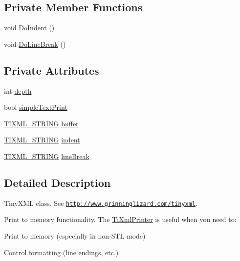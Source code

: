 \subsection*{Private Member Functions}
\begin{DoxyCompactItemize}
\item 
void \hyperlink{class_ti_xml_printer_a348ad6527b1d43ddeb51454cddeb6a1d}{Do\+Indent} ()
\item 
void \hyperlink{class_ti_xml_printer_a252a0e13e06def9a06b2eb30a04677a0}{Do\+Line\+Break} ()
\end{DoxyCompactItemize}
\subsection*{Private Attributes}
\begin{DoxyCompactItemize}
\item 
int \hyperlink{class_ti_xml_printer_a7e11330449daea912320c22f84387df7}{depth}
\item 
bool \hyperlink{class_ti_xml_printer_a2dceede5ae9bb8948f1ecaabb24ab2fb}{simple\+Text\+Print}
\item 
\hyperlink{tinyxml_8h_a92bada05fd84d9a0c9a5bbe53de26887}{T\+I\+X\+M\+L\+\_\+\+S\+T\+R\+I\+NG} \hyperlink{class_ti_xml_printer_ae6cc56c79e52ef352ecc612809fdbedf}{buffer}
\item 
\hyperlink{tinyxml_8h_a92bada05fd84d9a0c9a5bbe53de26887}{T\+I\+X\+M\+L\+\_\+\+S\+T\+R\+I\+NG} \hyperlink{class_ti_xml_printer_a672fda389bb3f5a2ae8ead867f9a2536}{indent}
\item 
\hyperlink{tinyxml_8h_a92bada05fd84d9a0c9a5bbe53de26887}{T\+I\+X\+M\+L\+\_\+\+S\+T\+R\+I\+NG} \hyperlink{class_ti_xml_printer_a25e8120bcfda10cc06a11b2dedcef7fe}{line\+Break}
\end{DoxyCompactItemize}


\subsection{Detailed Description}
Tiny\+X\+ML class. See \href{http://www.grinninglizard.com/tinyxml}{\tt http\+://www.\+grinninglizard.\+com/tinyxml}. 

Print to memory functionality. The \hyperlink{class_ti_xml_printer}{Ti\+Xml\+Printer} is useful when you need to\+:


\begin{DoxyEnumerate}
\item Print to memory (especially in non-\/\+S\+TL mode)
\item Control formatting (line endings, etc.)
\end{DoxyEnumerate}

